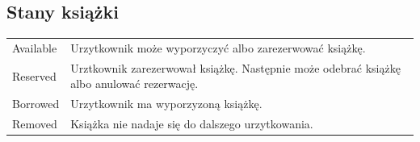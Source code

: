 \documentclass[12pt]{article}
\begin{document}
\subsection*{Stany książki}
\begin{table}[!ht]
    \centering
    \begin{tabularx}{1.01\textwidth}{ll}
        \toprule
        Available           & Urzytkownik może wyporzyczyć albo zarezerwować książkę.  \\
        Reserved            & Urztkownik zarezerwował książkę. Następnie może odebrać książkę albo anulować rezerwację. \\
        Borrowed            & Urzytkownik ma wyporzyzoną książkę.  \\
        Removed        &  Książka nie nadaje się do dalszego urzytkowania. \\
        \bottomrule
    \end{tabularx}
\end{table}
\end{document}
